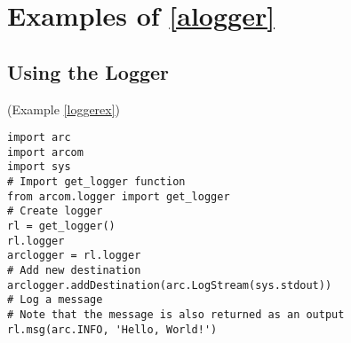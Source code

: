 \section{Examples of \ref{alogger}}
\subsection{Using the Logger}
(Example \ref{loggerex})
\label{cloggerex}
\begin{verbatim}
import arc
import arcom
import sys
# Import get_logger function
from arcom.logger import get_logger
# Create logger
rl = get_logger()
rl.logger
arclogger = rl.logger
# Add new destination
arclogger.addDestination(arc.LogStream(sys.stdout))
# Log a message
# Note that the message is also returned as an output
rl.msg(arc.INFO, 'Hello, World!')
\end{verbatim}


